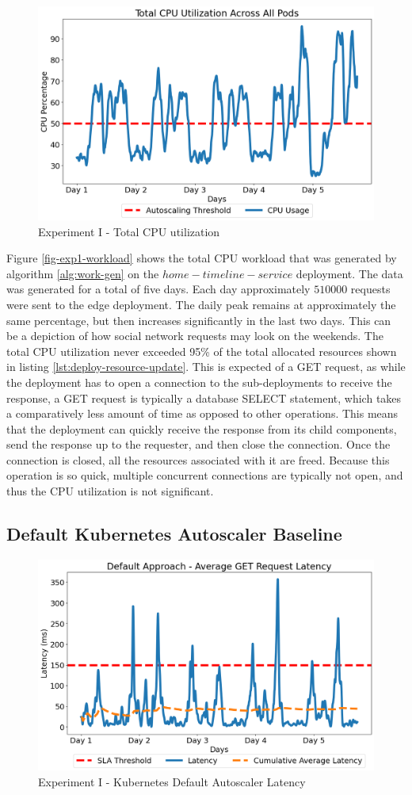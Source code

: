 \begin{figure}[htb]
    \centering
    \caption{Experiment I - Total CPU utilization}
    \label{fig:exp1-workload}
    \includegraphics[width=0.6\linewidth]{Figures/GET-Total-CPU.png}
\end{figure}

Figure \ref{fig-exp1-workload} shows the total CPU workload that was generated by algorithm \ref{alg:work-gen} on the $home-timeline-service$ deployment. The data was generated for a total of five days. Each day approximately $510000$ requests were sent to the edge deployment. The daily peak remains at approximately the same percentage, but then increases significantly in the last two days. This can be a depiction of how social network requests may look on the weekends. The total CPU utilization never exceeded 95\% of the total allocated resources shown in listing \ref{lst:deploy-resource-update}. This is expected of a GET request, as while the deployment has to open a connection to the sub-deployments to receive the response, a GET request is typically a database SELECT statement, which takes a comparatively less amount of time as opposed to other operations. This means that the deployment can quickly receive the response from its child components, send the response up to the requester, and then close the connection. Once the connection is closed, all the resources associated with it are freed. Because this operation is so quick, multiple concurrent connections are typically not open, and thus the CPU utilization is not significant.\par

\subsection {Default Kubernetes Autoscaler Baseline}
\label{subsec:ch5-exp1-default-algo}

\begin{figure}[htb]
    \centering
    \caption{Experiment I - Kubernetes Default Autoscaler Latency}
    \label{fig:exp1-default-k8s}
    \includegraphics[width=0.6\linewidth]{Figures/Home-Timeline-Default-Latency.png}
\end{figure}

